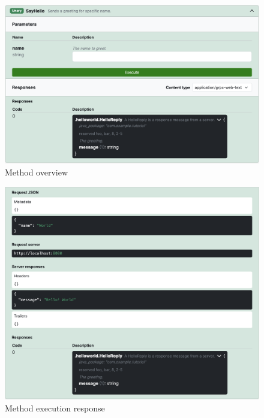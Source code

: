\begin{figure}[hbt!]
    \centering
    \captionsetup{justification=centering}
    \includegraphics[width=1.0\textwidth]{images/implementation/screenshots/method}
    \caption{Method overview}
    \label{fig:implementation-screenshots-method}
\end{figure}

\begin{figure}[hbt!]
    \centering
    \captionsetup{justification=centering}
    \includegraphics[width=1.0\textwidth]{images/implementation/screenshots/response}
    \caption{Method execution response}
    \label{fig:implementation-screenshots-response}
\end{figure}


